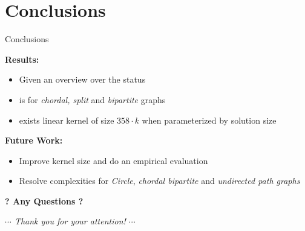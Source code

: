 \section{Conclusions}
\begin{frame}{Conclusions}

    \textbf{Results: }
    \begin{itemize}
        \pause \item Given an overview over the status
        \pause \item \sdom is \WONEhs for \textit{chordal, split} and \textit{bipartite} graphs
        \pause \item exists linear kernel of size $358 \cdot k$ when parameterized by solution size
    \end{itemize}


    \textbf{Future Work: }
    \begin{itemize}
        \pause \item Improve kernel size and do an empirical evaluation
        \pause \item Resolve complexities for \textit{Circle}, \textit{chordal bipartite} and \textit{undirected path graphs}  
    \end{itemize}
\end{frame}


\begin{frame}[c]{}
    \begin{center}
        \LARGE
        \textbf{? Any Questions ?}

        \small
        \textit{$\cdots$ Thank you for your attention! $\cdots$}
    \end{center}
\end{frame}